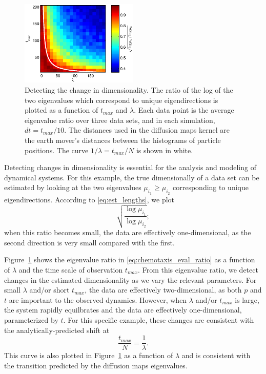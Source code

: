 \documentclass[3p]{elsarticle}
\begin{document}
\begin{figure}[t]
%
\centering
\includegraphics[width=0.5\textwidth]{tmax_lambda_transition}
%
\caption{Detecting the change in dimensionality. The ratio of the log of the two eigenvalues which correspond to unique eigendirections is plotted as a function of $t_{max}$ and $\lambda$. Each data point is the average eigenvalue ratio over three data sets, and in each simulation, $dt=t_{max}/10$. The distances used in the diffusion maps kernel are the earth mover's distances between the histograms of particle positions. The curve $1/\lambda = t_{max}/N$ is shown in white. }
%
\label{fig:chemotaxis_compare_timescales_evals}
%
\end{figure}

Detecting changes in dimensionality is essential for the analysis and modeling of dynamical systems. 
%
For this example, the true dimensionally of a data set can be estimated by looking at the two eigenvalues $\mu_{i_1} \ge \mu_{i_2}$ corresponding to unique eigendirections. 
%
According to \eqref{eq:est_lengths}, we plot  
\begin{equation}\label{eq:chemotaxis_eval_ratio}
 \sqrt{\frac{\log \mu_{i_1}}{\log \mu_{i_2}}} ;
\end{equation}
when this ratio becomes small, the data are effectively one-dimensional, as the second direction is very small compared with the first. 

Figure~\ref{fig:chemotaxis_compare_timescales_evals} shows the eigenvalue ratio in \eqref{eq:chemotaxis_eval_ratio} as a function of $\lambda$ and the time scale of observation $t_{max}$.
%
From this eigenvalue ratio, we detect changes in the estimated dimensionality as we vary the relevant parameters.
%
For small $\lambda$ and/or short $t_{max}$, the data are effectively two-dimensional, as both $p$ and $t$ are important to the observed dynamics. 
%
However, when $\lambda$ and/or $t_{max}$ is large, the system rapidly equilbrates and the data are effectively one-dimensional, parameterized by $t$. 
%
For this specific example, these changes are consistent with the analytically-predicted shift at 
\begin{equation}
\frac{t_{max}}{N} = \frac{1}{\lambda}.
\end{equation} 
%
This curve is also plotted in Figure~\ref{fig:chemotaxis_compare_timescales_evals} as a function of $\lambda$ and is consistent with the transition predicted by the diffusion maps eigenvalues. 
\end{document}
